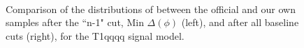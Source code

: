 \begin{figure}
        \centering
        \hspace{-1 cm}
        ~ %
        \caption{Comparison of the distributions of \MHT between the official and our own samples after the ``n-1" cut, Min $\Delta(\phi)$ (left), and after all baseline cuts (right), for the T1qqqq signal model.}\label{fig:animals}
\end{figure}        
        
